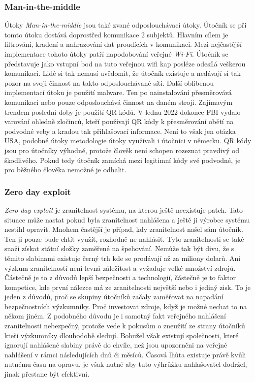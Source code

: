 \subsubsection{Man-in-the-middle}
Útoky \textit{Man-in-the-middle} jsou také zvané odposlouchávací útoky.
Útočník se při tomto útoku dostává doprostřed komunikace 2 subjektů.
Hlavním cílem je filtrování, kradení a nahrazování dat proudících v komunikaci.
Mezi nejčastější implementace tohoto útoky patří napodobování veřejné \textit{Wi-Fi}.
Útočník se představuje jako vstupní bod na tuto veřejnou wifi kap posléze odesílá veškerou komunikaci.
Lidé si tak nemusí uvědomit, že útočník existuje a nedávají si tak pozor na svoji činnost na takto odposlouchávané síti.
Další oblíbenou implementací útoku je použití malware.
Ten po nainstalování přesměrovává komunikaci nebo pouze odposlouchává činnost na daném stroji.
Zajímavým trendem poslední doby je použití QR kódů.
V lednu 2022 dokonce FBI vydalo varování ohledně zločinců, kteří používají QR kódy k přesměrování obětí na podvodné veby a kradou tak přihlašovací informace.
Není to však jen otázka USA, podobné útoky metodologie útoky využívali i útočníci v německu.
QR kódy jsou pro útočníky výhodné, protože člověk není schopen rozeznat pravdivý od škodlivého.
Pokud tedy útočník zamíchá mezi legitimní kódy své podvodné, je pro běžného člověka nemožné je odhalit.\cite{Enisa_thread_landscape, cisco_most_common_attack}


\subsubsection{Zero day exploit}
\textit{Zero day exploit} je zranitelnost systému, na kterou ještě neexistuje patch.
Tato situace může nastat pokud byla zranitelnost nahlášena a ještě ji výrobce systému nestihl opravit.
Mnohem častější je případ, kdy zranitelnost našel sám útočník.
Ten ji pouze bude chtít využít, rozhodně ne nahlásit.
Tyto zranitelnosti se také snaží získat státní složky zaměřené na špehování.
Nemůže tak být divu, že s těmito slabinami existuje černý trh\cite{world_end_2021} kde se prodávají až za miliony dolarů.
Ani výzkum zranitelností není levná záležitost a vyžaduje velké množství zdrojů.
Částečně je to z důvodů lepší bezpečnosti a technologií, částečně je to faktor kompetice, kde první nálezce má ze zranitelnosti největší nebo i jediný zisk.
To je jeden z důvodů, proč se skupiny útočníků začaly zaměřovat na napadání bezpečnostních výzkumníky.
Proč investovat zdroje, když je možné nechat to na někom jiném.
Z podobného důvodu je i samotný fakt veřejného nahlášení zranitelnosti nebezpečný, protože vede k pokusům o zneužití ze strany útočníků kteří výzkumníky dlouhodobě sledují.
Bohužel však existují společnosti, které ignorují nahlášené slabiny právě do chvíle, než jsou upozorněni na veřejné nahlášení v rámci následujících dnů či měsíců.
Časová lhůta existuje právě kvůli nutnému času na opravu, je však nutné aby tuto výhrůžku nahlašovatel dodržel, jinak přestane být efektivní.\cite{Enisa_thread_landscape}


